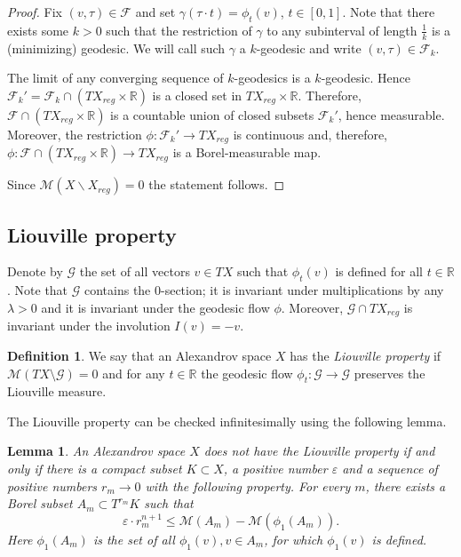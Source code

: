 \documentclass[12pt,leqno,intlimits]{amsart}
\numberwithin{equation}{section}
\newtheorem{lem}[thm]{Lemma}
\theoremstyle{definition}
\newtheorem{defn}[thm]{Definition}%
\theoremstyle{remark}
\newcommand{\R}{\mathbb{R}}
\def\:{\colon}
\begin{document}
\begin{proof}
Fix $(v,\tau)\in \mathcal F$ and set $\gamma(\tau\cdot t)=\phi_t(v)$, $t\in[0,1]$.
Note that there exists some $k>0$ such that the restriction of $\gamma$ to any subinterval of length $\frac 1 k$ is a (minimizing) geodesic.
 We will call such $\gamma$ a  $k$-geodesic and  write $(v,\tau)\in \mathcal F_k$.


 The limit of any converging sequence of $k$-geodesics is a $k$-geodesic.
Hence $\mathcal F_k'=\mathcal F_k\cap (TX_{reg} \times \R)$ is a closed set in $TX_{reg} \times \R$.
 Therefore, $\mathcal F\cap (TX_{reg} \times \R)$  is a countable union of closed subsets $\mathcal F_k'$, hence measurable.
Moreover, the restriction $\phi\: \mathcal F_k' \to TX_{reg}$ is continuous and, therefore,
$\phi \:\mathcal F\cap (TX_{reg} \times \R) \to TX_{reg}$ is a Borel-measurable map.

Since $\mathcal M(X\backslash X_{reg})=0$ the statement follows.
\end{proof}


\subsection{Liouville property}
Denote by $\mathcal G$ the set of all vectors $v\in TX $ such that $\phi _t(v)$ is defined for all $t\in \R$.
Note that $\mathcal G$ contains the $0$-section;
it is invariant under multiplications by any $\lambda>0$
and it is invariant under the geodesic flow $\phi$.
Moreover, $\mathcal G\cap TX_{reg}$ is invariant under the involution $I (v)=-v$.

\begin{defn}
We say that an Alexandrov space $X$ has the \emph{Liouville property} if $\mathcal M(TX\setminus \mathcal G)=0$ and
for any $t\in \R$ the geodesic flow $\phi _t \:\mathcal G\to \mathcal G$ preserves the Liouville measure.
\end{defn}

The Liouville property can be checked infinitesimally using the following lemma.

\begin{lem} \label{infini}
An Alexandrov space $X$ \emph{does not} have the Liouville property if and only if there is a compact subset $K\subset X$, a positive number
$\varepsilon$ and a sequence of positive numbers $r_m \to 0$ with the following property.
For every $m$, there exists a Borel subset $A_m\subset T^{r_ m} K$ such that
\begin{equation} \label{eq:m}
\varepsilon \cdot r_m^{n +1} \leq \mathcal M (A_m) -\mathcal M (\phi _1 (A_m)).
\end{equation}
 Here $\phi_1 (A_m)$ is the set of all $\phi _1(v), v\in A_m$, for which
$\phi _1(v)$ is defined.
\end{lem}
\end{document}
